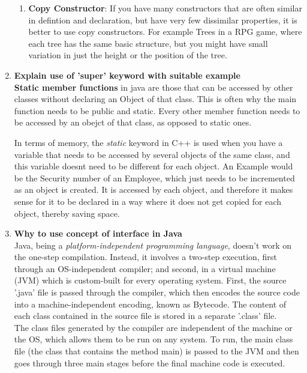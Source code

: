 \documentclass[11pt]{article}
\begin{document}
\begin{enumerate}
\begin{enumerate}
		      \item \textbf{Copy Constructor}: If you have many constructors that are often similar in defintion and declaration, but have very few dissimilar properties, it is better to use copy constructors. For example Trees in a RPG game, where each tree has the same basic structure, but you might have small variation in just the height or the position of the tree.
	      \end{enumerate}
	\item \textbf{Explain use of 'super' keyword with suitable example}\\

	      \textbf{Static member functions} in java are those that can be accessed by other classes without declaring an Object of that class. This is often why the main function needs to be public and static. Every other member function needs to be accessed by an obejct of that class, as opposed to static ones.

	      In terms of memory, the \textit{static} keyword in C++ is used when you have a variable that needs to be accessed by several objects of the same class, and this variable doesnt need to be different for each object. An Example would be the Security number of an Employee, which just needs to be incremented as an object is created. It is accessed by each object, and therefore it makes sense for it to be declared in a way where it does not get copied for each object, thereby saving space.
	\item \textbf{Why to use concept of interface in Java}\\
	      Java, being a \textit{platform-independent programming language}, doesn't work on the one-step compilation. Instead, it involves a two-step execution, first through an OS-independent compiler; and second, in a virtual machine (JVM) which is custom-built for every operating system. First, the source '.java' file is passed through the compiler, which then encodes the source code into a machine-independent encoding, known as Bytecode. The content of each class contained in the source file is stored in a separate '.class' file.\\

	      The class files generated by the compiler are independent of the machine or the OS, which allows them to be run on any system. To run, the main class file (the class that contains the method main) is passed to the JVM and then goes through three main stages before the final machine code is executed.

\end{enumerate}
\end{document}
